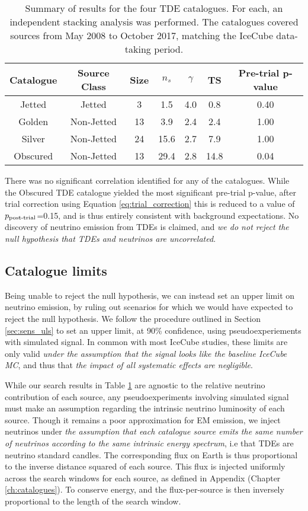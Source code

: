 \begin{table}[]
	\centering
	\begin{tabular}{||c c c| c c c | c||} 
		\hline
		Catalogue & Source Class & Size & $n_{s}$  & $\gamma$ & TS & Pre-trial p-value\\
		\hline\hline
		Jetted & Jetted &  3 & 1.5& 4.0&0.8&0.40\\ 
		\hline
		Golden & Non-Jetted & 13 &3.9&2.4& 2.4&1.00\\
		\hline
		Silver & Non-Jetted & 24 &15.6&2.7&7.9 & 1.00\\
		\hline
		Obscured & Non-Jetted & 13 &29.4&2.8&14.8& 0.04\\[1ex] 
		\hline
	\end{tabular}
	\caption{Summary of results for the four TDE catalogues. For each, an independent stacking analysis was performed. The catalogues covered sources from May 2008 to October 2017, matching the IceCube data-taking period.}
	\label{tab:stacking_tests}
\end{table}{}

There was no significant correlation identified for any of the catalogues. While the Obscured TDE catalogue yielded the most significant pre-trial p-value, after trial correction using Equation \ref{eq:trial_correction} this is reduced to a value of $p_{\textup{post-trial}}$=0.15, and is thus entirely consistent with background expectations. No discovery of neutrino emission from TDEs is claimed, and \emph{we do not reject the null hypothesis that TDEs and neutrinos are uncorrelated}.

\subsection{Catalogue limits}

Being unable to reject the null hypothesis, we can instead set an upper limit on neutrino emission, by ruling out scenarios for which we would have expected to reject the null hypothesis. We follow the procedure outlined in Section \ref{sec:sens_uls} to set an upper limit, at 90\% confidence, using pseudoexperiements with simulated signal. In common with most IceCube studies, these limits are only valid \emph{under the assumption that the signal looks like the baseline IceCube MC}, and thus that \emph{the impact of all systematic effects are negligible}.

While our search results in Table \ref{tab:stacking_tests} are agnostic to the relative neutrino contribution of each source, any pseudoexperiments involving simulated signal must make an assumption regarding the intrinsic neutrino luminosity of each source. Though it remains a poor approximation for EM emission, we inject neutrinos under \emph{the assumption that each catalogue source emits the same number of neutrinos according to the same intrinsic energy spectrum}, i.e that TDEs are neutrino standard candles. The corresponding flux on Earth is thus proportional to the inverse distance squared of each source. This flux is injected uniformly across the search windows for each source, as defined in Appendix (Chapter \ref{ch:catalogues}). To conserve energy, and the flux-per-source is then inversely proportional to the length of the search window. 

